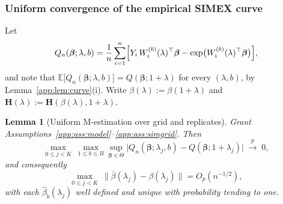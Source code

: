 \documentclass[11pt]{article}
\theoremstyle{plain}
\newtheorem{lemma}{Lemma}
\theoremstyle{definition}
\newcommand{\E}{\mathbb{E}}
\newcommand{\bet}{\bm{\beta}}
\begin{document}
\subsubsection{Uniform convergence of the empirical SIMEX curve}\label{app:sec:curve}

Let
\[
  Q_n(\bet;\lambda,b)=\frac1n\sum_{i=1}^n
  \Bigl[Y_i\,W_i^{(b)}(\lambda)^\top\bet
  -\exp\bigl(W_i^{(b)}(\lambda)^\top\bet\bigr)\Bigr],
\]
and note that
$\E\bigl[Q_n(\bet;\lambda,b)\bigr]=Q(\bet;1+\lambda)$ for every
$(\lambda,b)$, by Lemma~\ref{app:lem:curve}(i). Write
$\beta(\lambda):=\beta(1+\lambda)$ and
$\bm H(\lambda):=\bm H(\beta(\lambda),1+\lambda)$.

\begin{lemma}[Uniform M-estimation over grid and replicates]
\label{app:lem:unif}
Grant Assumptions~\ref{app:ass:model}--\ref{app:ass:simgrid}. Then
\[
  \max_{0\le j<K}\ \max_{1\le b\le B}
  \sup_{\bet\in\Theta}\bigl|Q_n(\bet;\lambda_j,b)-Q(\bet;1+\lambda_j)\bigr|
  \;\xrightarrow{p}\;0,
\]
and consequently
\[
  \max_{0\le j<K}\ \|\bar\beta(\lambda_j)-\beta(\lambda_j)\|
  =O_p(n^{-1/2}),
\]
with each $\hat\beta_b(\lambda_j)$ well defined and unique with probability
tending to one.
\end{lemma}
\end{document}
